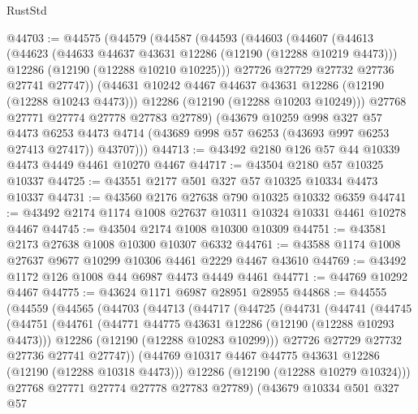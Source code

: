 \begin{lexlean}{RustStd}
\begin{coremodule}
@44703 := @44575
    (@44579
      (@44587
        (@44593
          (@44603
            (@44607
              (@44613
                (@44623
                  (@44633 @44637 @43631 @12286 (@12190 (@12288 @10219 @4473)))
                  @12286
                  (@12190 (@12288 @10210 @10225)))
                @27726
                @27729
                @27732
                @27736
                @27741
                @27747))
            (@44631 @10242 @4467 @44637 @43631 @12286 (@12190 (@12288 @10243 @4473)))
            @12286
            (@12190 (@12288 @10203 @10249)))
          @27768
          @27771
          @27774
          @27778
          @27783
          @27789)
        (@43679
          @10259
          @998
          @327
          @57
          @4473
          @6253
          @4473
          @4714
          (@43689 @998 @57 @6253 (@43693 @997 @6253 @27413 @27417))
          @43707)))
@44713 := @43492 @2180 @126 @57 @44 @10339 @4473 @4449 @4461 @10270 @4467
@44717 := @43504 @2180 @57 @10325 @10337
@44725 := @43551 @2177 @501 @327 @57 @10325 @10334 @4473 @10337
@44731 := @43560 @2176 @27638 @790 @10325 @10332 @6359
@44741 := @43492 @2174 @1174 @1008 @27637 @10311 @10324 @10331 @4461 @10278 @4467
@44745 := @43504 @2174 @1008 @10300 @10309
@44751 := @43581 @2173 @27638 @1008 @10300 @10307 @6332
@44761 := @43588 @1174 @1008 @27637 @9677 @10299 @10306 @4461 @2229 @4467 @43610
@44769 := @43492 @1172 @126 @1008 @44 @6987 @4473 @4449 @4461
@44771 := @44769 @10292 @4467
@44775 := @43624 @1171 @6987 @28951 @28955
@44868 := @44555
    (@44559
      (@44565
        (@44703
          (@44713
            (@44717
              (@44725
                (@44731
                  (@44741
                    (@44745
                      (@44751
                        (@44761
                          (@44771 @44775 @43631 @12286 (@12190 (@12288 @10293 @4473)))
                          @12286
                          (@12190 (@12288 @10283 @10299)))
                        @27726
                        @27729
                        @27732
                        @27736
                        @27741
                        @27747))
                    (@44769 @10317 @4467 @44775 @43631 @12286 (@12190 (@12288 @10318 @4473)))
                    @12286
                    (@12190 (@12288 @10279 @10324)))
                  @27768
                  @27771
                  @27774
                  @27778
                  @27783
                  @27789)
                (@43679
                  @10334
                  @501
                  @327
                  @57

\end{coremodule}
\end{lexlean}
